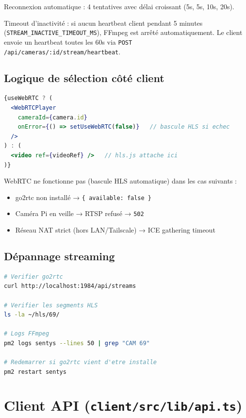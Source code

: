 \documentclass[12pt,a4paper]{article}
\begin{document}
Reconnexion automatique : 4 tentatives avec délai croissant (5s, 5s, 10s, 20s).

Timeout d'inactivité : si aucun heartbeat client pendant 5 minutes
(\texttt{STREAM\_INACTIVE\_TIMEOUT\_MS}), FFmpeg est arrêté automatiquement.
Le client envoie un heartbeat toutes les 60s via
\texttt{POST /api/cameras/:id/stream/heartbeat}.

\subsection{Logique de sélection côté client}

\begin{lstlisting}[language=jsx, caption={CameraFeed.tsx — bascule WebRTC/HLS}]
{useWebRTC ? (
  <WebRTCPlayer
    cameraId={camera.id}
    onError={() => setUseWebRTC(false)}   // bascule HLS si echec
  />
) : (
  <video ref={videoRef} />   // hls.js attache ici
)}
\end{lstlisting}

WebRTC ne fonctionne pas (bascule HLS automatique) dans les cas suivants :
\begin{itemize}
  \item go2rtc non installé → \texttt{\{ available: false \}}
  \item Caméra Pi en veille → RTSP refusé → \texttt{502}
  \item Réseau NAT strict (hors LAN/Tailscale) → ICE gathering timeout
\end{itemize}

\subsection{Dépannage streaming}

\begin{lstlisting}[language=bash]
# Verifier go2rtc
curl http://localhost:1984/api/streams

# Verifier les segments HLS
ls -la ~/hls/69/

# Logs FFmpeg
pm2 logs sentys --lines 50 | grep "CAM 69"

# Redemarrer si go2rtc vient d'etre installe
pm2 restart sentys
\end{lstlisting}

\section{Client API (\texttt{client/src/lib/api.ts})}
\end{document}
